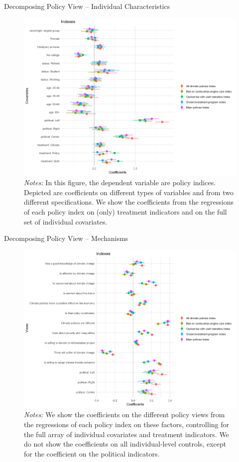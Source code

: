 \begin{frame}{Decomposing Policy View -- Individual Characteristics}%
\begin{figure}[h!]
\includegraphics[width=.56\textwidth]{../../figures/Gelbach/coef_policy_views_all} \\
{\tiny \textit{Notes:} In this figure, the dependent variable are policy indices. Depicted are coefficients on different types of variables and from two different specifications. We show the coefficients from the regressions of each policy index on (only) treatment indicators and on the full set of individual covariates.}
\end{figure}
\end{frame}

\begin{frame}{Decomposing Policy View -- Mechanisms}%
\begin{figure}[h!]
\includegraphics[width=.56\textwidth]{../../figures/Gelbach/coef_policy_views_indexes_all} \\
{\tiny \textit{Notes:} We show the coefficients on the different policy views from the regressions of each policy index on these factors, controlling for the full array of individual covariates and treatment indicators. We do not show the coefficients on all individual-level controls, except for the coefficient on the political indicators.}
\end{figure}
\end{frame}

